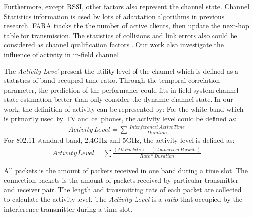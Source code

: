 Furthermore, except RSSI, other factors also represent the channel state. Channel Statistics information is used by lots of adaptation algorithms in previous research.
FARA tracks the the number of active clients, then update the next-hop table for transmission\cite{rahul2009frequency}.
The statistics of collisions and link errors also could be considered as channel qualification factors \cite{pang2005rate}.
Our work also investigate the influence of activity in in-field channel.

The \emph{Activity Level} present the utility level of the channel
which is defined as a statistics of band occupied time ratio. Through the temporal correlation parameter, the prediction of the performance could fits in-field system channel state estimation better than only consider the dynamic channel state.
In our work, the definition of activity can be represented by:
For the white band which is primarily used by TV and cellphones, the activity level could be defined as:
\begin{align}
\label{equation:non802 Activity Level}
Activity\,Level = \sum{\frac{Interferencei\ Active\ Time}{Duration}}
\end{align}
For 802.11 standard band, 2.4GHz and 5GHz, the activity level is defined as:
\begin{align}
\label{equation:802 Activity Level}
Activity\,Level = \sum{\frac{(All\, Packets)-(Connection\, Packets)}{Rate*Duration}}
\end{align}

All packets is the amount of packets received in one band during a time slot.
The connection packets is the amount of packets received by particular transmitter and receiver pair. 
The length and transmitting rate of each packet are collected to calculate the activity level.
The \emph{Activity Level} is a \emph{ratio} that occupied by the interference transmitter during a time slot. 



